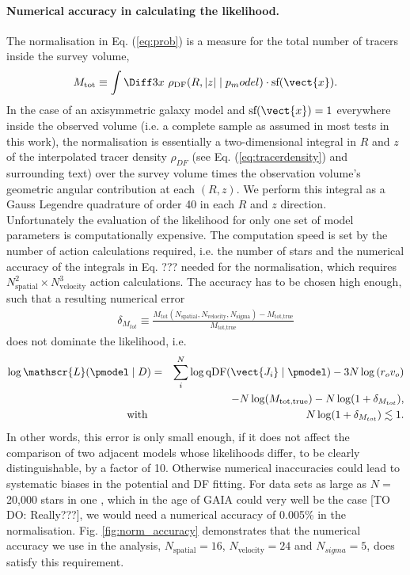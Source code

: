 \paragraph{Numerical accuracy in calculating the likelihood.} The normalisation in Eq. (\ref{eq:prob}) is a measure for the total number of tracers inside the survey volume,
\begin{equation}
M_\text{tot} \equiv \int \Diff 3 x \  \rho_\text{DF}(R,|z| \mid p_model) \cdot \text{sf}(\vect{x}).\label{eq:normalisation}
\end{equation}
In the case of an axisymmetric galaxy model and $\text{sf}(\vect{x})=1$ everywhere inside the observed volume (i.e. a complete sample as assumed in most tests in this work), the normalisation is essentially a two-dimensional integral in $R$ and $z$ of the interpolated tracer density $\rho_{DF}$ (see Eq. (\ref{eq:tracerdensity}) and surrounding text) over the survey volume times the observation volume's geometric angular contribution at each $(R,z)$. We perform this integral as a Gauss Legendre quadrature of order 40 in each $R$ and $z$ direction.
\\Unfortunately the evaluation of the likelihood for only one set of model parameters is computationally expensive. The computation speed is set by the number of action calculations required, i.e. the number of stars and the numerical accuracy of the integrals in Eq. ??? needed for the normalisation, which requires $N_\text{spatial}^2 \times N_\text{velocity}^3$ action calculations. The accuracy has to be chosen high enough, such that a resulting numerical error 
\begin{eqnarray}
\delta_{M_{tot}} \equiv \frac{M_\text{tot}(N_\text{spatial},N_\text{velocity},N_\text{sigma}) -  M_\text{tot,true} }{M_\text{tot,true}}\label{eq:relerrlikelihood}
\end{eqnarray}
does not dominate the likelihood, i.e.
\begin{eqnarray}
\log \mathscr{L}(\pmodel \mid D) &=& \sum_i^{N} \log \text{qDF}(\vect{J_i} \mid \pmodel) - 3N \log \left( r_o v_o\right)\nonumber\\
& & -N \log(M_\text{tot,true}) - N \log (1 + \delta_{M_{tot}}),\label{eq:loglikelihood_relerr}\\
 \text{with }  & &N \log (1 + \delta_{M_{tot}}) \lesssim 1.\nonumber
\end{eqnarray}
In other words, this error is only small enough, if it does not affect the comparison of two adjacent models whose likelihoods differ, to be clearly distinguishable, by a factor of 10. Otherwise numerical inaccuracies could lead to systematic biases in the potential and DF fitting. For data sets as large as $N =$ 20,000 stars in one \MAP, which in the age of GAIA could very well be the case [TO DO: Really???], we would need a numerical accuracy of 0.005\% in the normalisation. Fig. \ref{fig:norm_accuracy} demonstrates that the numerical accuracy we use in the analysis, $N_\text{spatial}=16$, $N_\text{velocity}=24$ and $N_{sigma}=5$, does satisfy this requirement.


